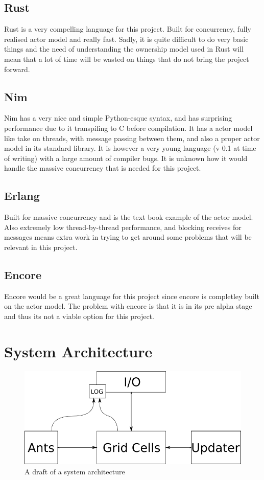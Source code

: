 \documentclass[a4paper]{article}
\begin{document}
\subsection{Rust}
Rust is a very compelling language for this project. Built for concurrency, fully realised
actor model and really fast. Sadly, it is quite difficult to do very basic things and the need
of understanding the ownership model used in Rust will mean that a lot of time will be wasted
on things that do not bring the project forward. 

\subsection{Nim}
Nim has a very nice and simple Python-esque syntax, and has surprising performance due to it
transpiling to C before compilation. It has a actor model like take on threads, with message
passing between them, and also a proper actor model in its standard library. It is however a
very young language (v 0.1 at time of writing) with a large amount of compiler bugs. It is
unknown how it would handle the massive concurrency that is needed for this project. 

\subsection{Erlang}
Built for massive concurrency and is the text book example of the actor model. Also extremely
low thread-by-thread performance, and blocking receives for messages means extra work in
trying to get around some problems that will be relevant in this project. 

\subsection{Encore}
Encore would be a great language for this project since encore is completley
built on the actor model. The problem with encore is that it is in its pre
alpha stage and thus its not a viable option for this project.

\section{System Architecture}
\begin{figure}[h!]
\centerline{
\includegraphics[scale=0.6]{images/architecture.png} 
}
\caption{A draft of a system architecture} 
\label{fig:arch}
\end{figure}
\end{document}
